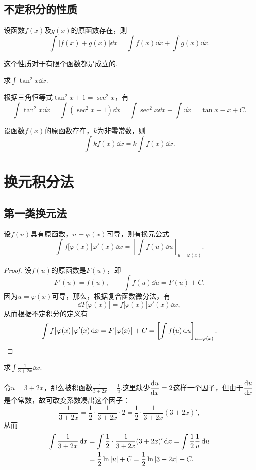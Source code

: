 \subsection{不定积分的性质}
\begin{property}
设函数\(f(x)\)及\(g(x)\)的原函数存在，则\[
\int \bigl[f(x) + g(x)\bigr] \dd{x} = \int f(x) \dd{x} + \int g(x) \dd{x}.
\]
\end{property}
这个性质对于有限个函数都是成立的.

\begin{example}
求\(\int \tan^2 x \dd{x}\).
\begin{solution}
根据三角恒等式\(\tan^2 x + 1 = \sec^2 x\)，有\[
\int \tan^2 x \dd{x}
= \int (\sec^2 x - 1) \dd{x}
= \int \sec^2 x \dd{x} - \int \dd{x}
= \tan x - x + C.
\]
\end{solution}
\end{example}

\begin{property}
设函数\(f(x)\)的原函数存在，\(k\)为非零常数，则\[
\int k f(x) \dd{x} = k \int f(x) \dd{x}.
\]
\end{property}

\section{换元积分法}
\subsection{第一类换元法}
\begin{theorem}
设\(f(u)\)具有原函数，\(u=\varphi(x)\)可导，则有换元公式\[
\int f\bigl[\varphi(x)\bigr] \varphi'(x) \dd{x} = \left[ \int f(u) \dd{u} \right]_{u=\varphi(x)}.
\]
\begin{proof}
设\(f(u)\)的原函数是\(F(u)\)，即\[
F'(u) = f(u),
\qquad
\int f(u) \dd{u} = F(u) + C.
\]因为\(u = \varphi(x)\)可导，那么，根据复合函数微分法，有\[
\dd{F\bigl[\varphi(x)\bigr]} = f\bigl[\varphi(x)\bigr] \varphi'(x) \dd{x},
\]从而根据不定积分的定义有\[
\int f\bigl[\varphi(x)\bigr] \varphi'(x) \dd{x}
= F\bigl[\varphi(x)\bigr] + C
= \left[ \int f(u) \dd{u} \right]_{u=\varphi(x)}.
\qedhere
\]
\end{proof}
\end{theorem}

\begin{example}
求\(\int \frac{1}{3+2x} \dd{x}\).
\begin{solution}
令\(u = 3+2x\)，那么被积函数\(\frac{1}{3+2x} = \frac{1}{u}\).这里缺少\(\displaystyle\dv{u}{x}=2\)这样一个因子，但由于\(\displaystyle\dv{u}{x}\)是个常数，故可改变系数凑出这个因子：\[
\frac{1}{3+2x} = \frac{1}{2} \cdot \frac{1}{3+2x} \cdot 2 = \frac{1}{2} \cdot \frac{1}{3+2x} (3+2x)',
\]从而\begin{align*}
\int \frac{1}{3+2x} \dd{x}
&= \int \frac{1}{2} \cdot \frac{1}{3+2x} (3+2x)' \dd{x}
= \int \frac{1}{2} \frac{1}{u} \dd{u} \\
&= \frac{1}{2} \ln\abs{u} + C
= \frac{1}{2} \ln\abs{3+2x} + C.
\end{align*}
\end{solution}
\end{example}

